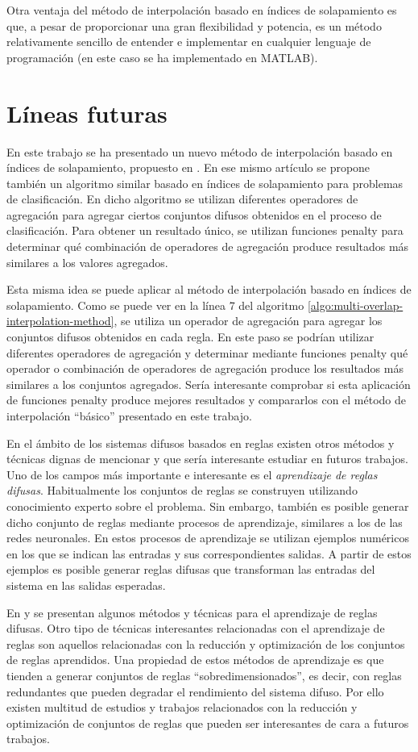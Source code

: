 Otra ventaja del método de interpolación basado en índices de solapamiento es que, a pesar de proporcionar una gran flexibilidad y potencia, es un método relativamente sencillo de entender e implementar en cualquier lenguaje de programación (en este caso se ha implementado en MATLAB).

\chapter{Líneas futuras}
En este trabajo se ha presentado un nuevo método de interpolación basado en índices de solapamiento, propuesto en \cite{bustince2013overlap}. En ese mismo artículo se propone también un algoritmo similar basado en índices de solapamiento para problemas de clasificación. En dicho algoritmo se utilizan diferentes operadores de agregación para agregar ciertos conjuntos difusos obtenidos en el proceso de clasificación. Para obtener un resultado único, se utilizan funciones penalty \cite{Bustince2014} para determinar qué combinación de operadores de agregación produce resultados más similares a los valores agregados.

Esta misma idea se puede aplicar al método de interpolación basado en índices de solapamiento. Como se puede ver en la línea 7 del algoritmo \ref{algo:multi-overlap-interpolation-method},  se utiliza un operador de agregación para agregar los conjuntos difusos obtenidos en cada regla. En este paso se podrían utilizar diferentes operadores de agregación y determinar mediante funciones penalty qué operador o combinación de operadores de agregación produce los resultados más similares a los conjuntos agregados. Sería interesante comprobar si esta aplicación de funciones penalty produce mejores resultados y compararlos con el método de interpolación ``básico'' presentado en este trabajo.

En el ámbito de los sistemas difusos basados en reglas existen otros métodos y técnicas dignas de mencionar y que sería interesante estudiar en futuros trabajos. Uno de los campos más importante e interesante es el \emph{aprendizaje de reglas difusas}. Habitualmente los conjuntos de reglas se construyen utilizando conocimiento experto sobre el problema. Sin embargo, también es posible generar dicho conjunto de reglas mediante procesos de aprendizaje, similares a los de las redes neuronales. En estos procesos de aprendizaje se utilizan ejemplos numéricos en los que se indican las entradas y sus correspondientes salidas. A partir de estos ejemplos es posible generar reglas difusas que transforman las entradas del sistema en las salidas esperadas.

En \cite{Alcala99} y \cite{Serrurier2007} se presentan algunos métodos y técnicas para el aprendizaje de reglas difusas. Otro tipo de técnicas interesantes relacionadas con el aprendizaje de reglas son aquellos relacionadas con la reducción y optimización de los conjuntos de reglas aprendidos. Una propiedad de estos métodos de aprendizaje es que tienden a generar conjuntos de reglas ``sobredimensionados'', es decir, con reglas redundantes que pueden degradar el rendimiento del sistema difuso. Por ello existen multitud de estudios y trabajos relacionados con la reducción y optimización de conjuntos de reglas que pueden ser interesantes de cara a futuros trabajos.